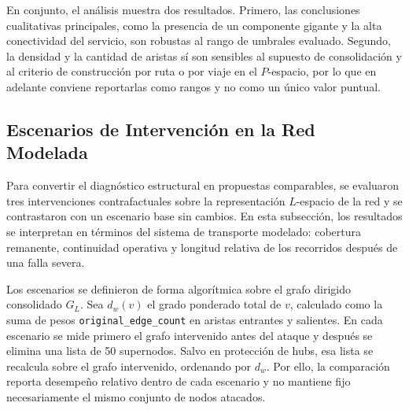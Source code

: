             En conjunto, el análisis muestra dos resultados. Primero, las conclusiones cualitativas principales, como la presencia de un componente gigante y la alta conectividad del servicio, son robustas al rango de umbrales evaluado. Segundo, la densidad y la cantidad de aristas sí son sensibles al supuesto de consolidación y al criterio de construcción por ruta o por viaje en el \(P\)-espacio, por lo que en adelante conviene reportarlas como rangos y no como un único valor puntual.

        \subsection{Escenarios de Intervención en la Red Modelada}
            Para convertir el diagnóstico estructural en propuestas comparables, se evaluaron tres intervenciones contrafactuales sobre la representación \(L\)-espacio de la red y se contrastaron con un escenario base sin cambios. En esta subsección, los resultados se interpretan en términos del sistema de transporte modelado: cobertura remanente, continuidad operativa y longitud relativa de los recorridos después de una falla severa.

            Los escenarios se definieron de forma algorítmica sobre el grafo dirigido consolidado \(G_L\). Sea \(d_w(v)\) el grado ponderado total de \(v\), calculado como la suma de pesos \texttt{original\_edge\_count} en aristas entrantes y salientes. En cada escenario se mide primero el grafo intervenido antes del ataque y después se elimina una lista de 50 supernodos. Salvo en protección de hubs, esa lista se recalcula sobre el grafo intervenido, ordenando por \(d_w\). Por ello, la comparación reporta desempeño relativo dentro de cada escenario y no mantiene fijo necesariamente el mismo conjunto de nodos atacados.


